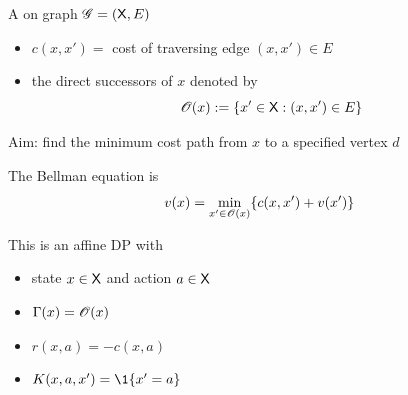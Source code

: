 \documentclass[dvipsnames]{beamer}
\begin{document}
\begin{frame}
    
    \Eg A  on graph $\mathscr G = (\mathsf X, E)$

    \vspace{0.5em}

    \begin{itemize}
        \item $c(x,x') =$ cost of traversing edge $(x,x') \in E$
        \vspace{0.5em}
        \item the direct successors of $x$ denoted by
            \begin{equation*}
                \mathscr O(x) := \{ x' \in \mathsf X : (x, x') \in E \}   
            \end{equation*}
    \end{itemize}
    

    \vspace{0.5em}
    \vspace{0.5em}
    \vspace{0.5em}
    Aim: find the minimum cost path from $x$ to a specified vertex $d$ 


\end{frame}



\begin{frame}

    The Bellman equation is
    \begin{equation*}
        v(x) = \min_{x' \in \mathscr O(x)} \{ c(x, x') + v(x') \}
    \end{equation*}

    \medskip


    This is an affine DP with 
    \begin{itemize}
        \item state $x \in \mathsf X$ and action $a \in \mathsf X$
        \medskip
        \item $\Gamma(x) = \mathscr O(x)$ 
        \medskip
        \item $r(x, a) = -c(x, a)$ 
        \medskip
        \item $K(x, a, x') = \1\{x' = a\}$
    \end{itemize}

\end{frame}
\end{document}
